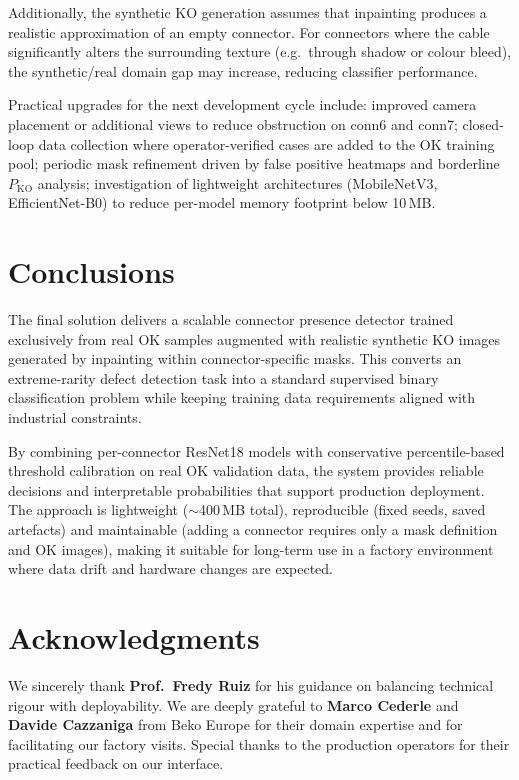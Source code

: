 \documentclass[11pt,a4paper,draft]{article}
\begin{document}
Additionally, the synthetic KO generation assumes that inpainting produces a realistic approximation of an empty connector. For connectors where the cable significantly alters the surrounding texture (e.g.\ through shadow or colour bleed), the synthetic/real domain gap may increase, reducing classifier performance.

Practical upgrades for the next development cycle include: improved camera placement or additional views to reduce obstruction on conn6 and conn7; closed-loop data collection where operator-verified cases are added to the OK training pool; periodic mask refinement driven by false positive heatmaps and borderline $P_{\mathrm{KO}}$ analysis; investigation of lightweight architectures (MobileNetV3, EfficientNet-B0) to reduce per-model memory footprint below 10\,MB.


\section{Conclusions}

The final solution delivers a scalable connector presence detector trained exclusively from real OK samples augmented with realistic synthetic KO images generated by inpainting within connector-specific masks. This converts an extreme-rarity defect detection task into a standard supervised binary classification problem while keeping training data requirements aligned with industrial constraints.

By combining per-connector ResNet18 models with conservative percentile-based threshold calibration on real OK validation data, the system provides reliable decisions and interpretable probabilities that support production deployment. The approach is lightweight ($\sim$400\,MB total), reproducible (fixed seeds, saved artefacts) and maintainable (adding a connector requires only a mask definition and OK images), making it suitable for long-term use in a factory environment where data drift and hardware changes are expected.

\section{Acknowledgments}

We sincerely thank \textbf{Prof.\ Fredy Ruiz} for his guidance on balancing technical rigour with deployability. We are deeply grateful to \textbf{Marco Cederle} and \textbf{Davide Cazzaniga} from Beko Europe for their domain expertise and for facilitating our factory visits. Special thanks to the production operators for their practical feedback on our interface.
\end{document}
